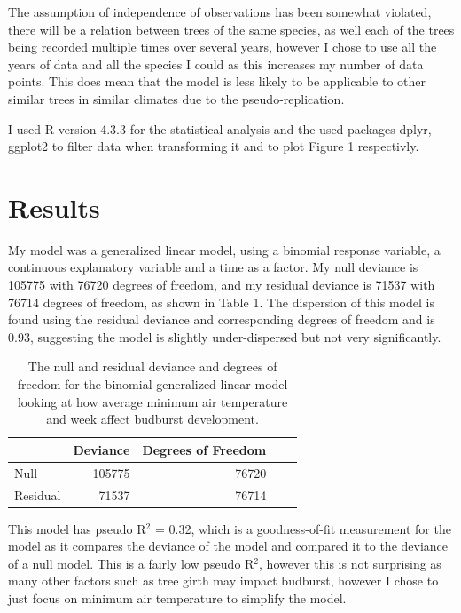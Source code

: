 \documentclass{article}
\begin{document}
 The assumption of independence of observations has been somewhat violated, there will be a relation between trees of the same species, as well each of the trees being recorded multiple times over several years, however I chose to use all the years of data and all the species I could as this increases my number of data points. This does mean that the model is less likely to be applicable to other similar trees in similar climates due to the pseudo-replication. 

I used R version 4.3.3 for the statistical analysis and the used packages dplyr, ggplot2 to filter data when transforming it and to plot Figure 1 respectivly.

\section{Results}
My model was a generalized linear model, using a binomial response variable, a continuous explanatory variable and a time as a factor. My null deviance is 105775 with 76720 degrees of freedom, and my residual deviance is 71537 with 76714 degrees of freedom, as shown in Table 1. The dispersion of this model is found using the residual deviance and corresponding degrees of freedom and is 0.93, suggesting the model is slightly under-dispersed but not very significantly. 

\begin{table} [h!]
    \caption{The null and residual deviance and degrees of freedom for the binomial generalized linear model looking at how average minimum air temperature and week affect budburst development.}
    \centering
    \begin{tabular}{|l|r|r|r|r|}
    \hline
         & Deviance & Degrees of Freedom\\
         \hline
      Null   & 105775 & 76720 \\
      Residual & 71537 & 76714 \\
      \hline
    \end{tabular}

    \label{tab:my_label}
\end{table}

This model has pseudo R$^2$ = 0.32, which is a goodness-of-fit measurement for the model as it compares the deviance of the model and compared it to the deviance of a null model. This is a fairly low pseudo R$^2$, however this is not surprising as many other factors such as tree girth may impact budburst, however I chose to just focus on minimum air temperature to simplify the model.
\end{document}

